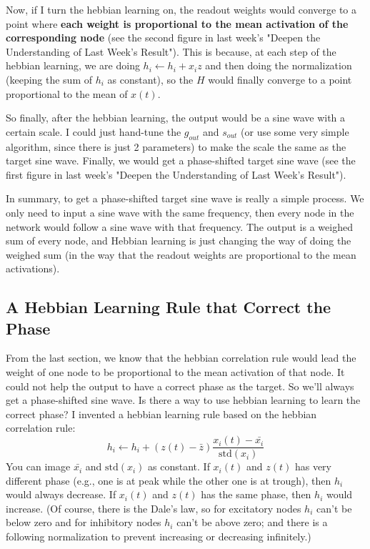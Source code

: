 \documentclass[12pt, a4paper]{article}
\begin{document}
Now, if I turn the hebbian learning on, the readout weights would converge to a point where \textbf{each weight is proportional to the mean activation of the corresponding node} (see the second figure in last week's "Deepen the Understanding of Last Week's Result"). This is because, at each step of the hebbian learning, we are doing $h_i \leftarrow h_i + x_i z$ and then doing the normalization (keeping the sum of $h_i$ as constant), so the $H$ would finally converge to a point proportional to the mean of $x(t)$.

So finally, after the hebbian learning, the output would be a sine wave with a certain scale. I could just hand-tune the $g_{out}$ and $s_{out}$ (or use some very simple algorithm, since there is just 2 parameters) to make the scale the same as the target sine wave. Finally, we would get a phase-shifted target sine wave (see the first figure in last week's "Deepen the Understanding of Last Week's Result").

In summary, to get a phase-shifted target sine wave is really a simple process. We only need to input a sine wave with the same frequency, then every node in the network would follow a sine wave with that frequency. The output is a weighed sum of every node, and Hebbian learning is just changing the way of doing the weighed sum (in the way that the readout weights are proportional to the mean activations).

\newpage

\subsection*{A Hebbian Learning Rule that Correct the Phase}

From the last section, we know that the hebbian correlation rule would lead the weight of one node to be proportional to the mean activation of that node. It could not help the output to have a correct phase as the target. So we'll always get a phase-shifted sine wave. Is there a way to use hebbian learning to learn the correct phase? I invented a hebbian learning rule based on the hebbian correlation rule: $$h_i \leftarrow h_i + (z(t) - \bar{z}) \frac{x_i(t) - \bar{x_i}}{\text{std}(x_i)}$$
You can image $\bar{x_i}$ and $\text{std}(x_i)$ as constant. If $x_i(t)$ and $z(t)$ has very different phase (e.g., one is at peak while the other one is at trough), then $h_i$ would always decrease. If $x_i(t)$ and $z(t)$ has the same phase, then $h_i$ would increase. (Of course, there is the Dale's law, so for excitatory nodes $h_i$ can't be below zero and for inhibitory nodes $h_i$ can't be above zero; and there is a following normalization to prevent increasing or decreasing infinitely.)
\end{document}
